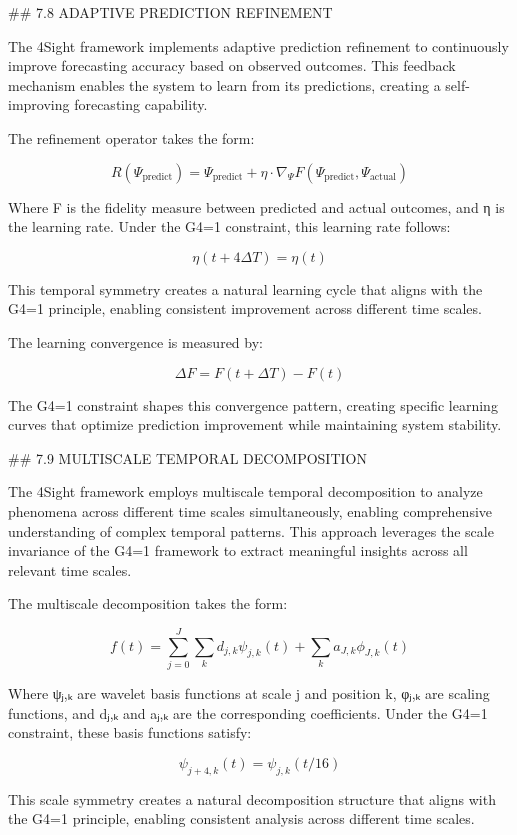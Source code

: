 ## 7.8 ADAPTIVE PREDICTION REFINEMENT

The 4Sight framework implements adaptive prediction refinement to continuously improve forecasting accuracy based on observed outcomes. This feedback mechanism enables the system to learn from its predictions, creating a self-improving forecasting capability.

The refinement operator takes the form:

$$R(\Psi_{\text{predict}}) = \Psi_{\text{predict}} + \eta \cdot \nabla_{\Psi} F(\Psi_{\text{predict}}, \Psi_{\text{actual}})$$

Where F is the fidelity measure between predicted and actual outcomes, and η is the learning rate. Under the G4=1 constraint, this learning rate follows:

$$\eta(t+4\Delta T) = \eta(t)$$

This temporal symmetry creates a natural learning cycle that aligns with the G4=1 principle, enabling consistent improvement across different time scales.

The learning convergence is measured by:

$$\Delta F = F(t+\Delta T) - F(t)$$

The G4=1 constraint shapes this convergence pattern, creating specific learning curves that optimize prediction improvement while maintaining system stability.

## 7.9 MULTISCALE TEMPORAL DECOMPOSITION

The 4Sight framework employs multiscale temporal decomposition to analyze phenomena across different time scales simultaneously, enabling comprehensive understanding of complex temporal patterns. This approach leverages the scale invariance of the G4=1 framework to extract meaningful insights across all relevant time scales.

The multiscale decomposition takes the form:

$$f(t) = \sum_{j=0}^J \sum_{k} d_{j,k} \psi_{j,k}(t) + \sum_k a_{J,k} \phi_{J,k}(t)$$

Where ψⱼ,ₖ are wavelet basis functions at scale j and position k, φⱼ,ₖ are scaling functions, and dⱼ,ₖ and aⱼ,ₖ are the corresponding coefficients. Under the G4=1 constraint, these basis functions satisfy:

$$\psi_{j+4,k}(t) = \psi_{j,k}(t/16)$$

This scale symmetry creates a natural decomposition structure that aligns with the G4=1 principle, enabling consistent analysis across different time scales.

